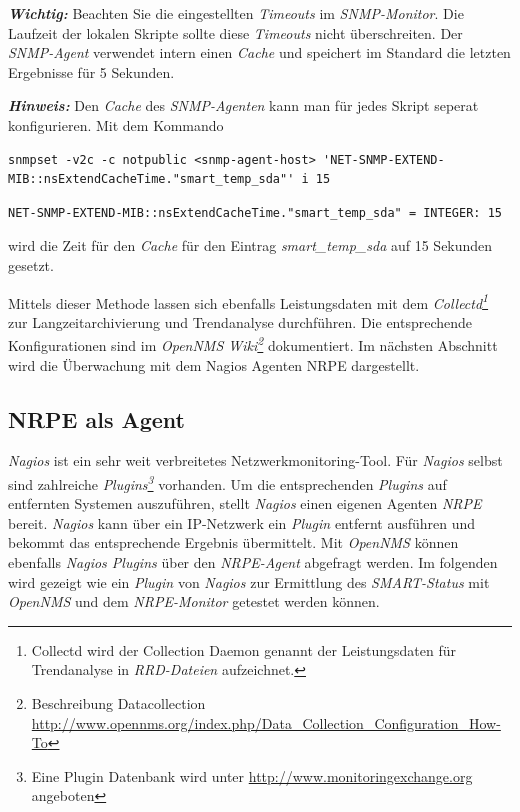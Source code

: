 \textbf{\textit{Wichtig:}} Beachten Sie die eingestellten \emph{Timeouts} im \emph{SNMP-Monitor}. Die Laufzeit der lokalen Skripte sollte diese \emph{Timeouts} nicht überschreiten. Der \emph{SNMP-Agent} verwendet intern einen \emph{Cache} und speichert im Standard die letzten Ergebnisse für 5 Sekunden. 

\textbf{\textit{Hinweis:}} Den \emph{Cache} des \emph{SNMP-Agenten} kann man für jedes Skript seperat konfigurieren. Mit dem Kommando

\begin{lstlisting}[numbers=none]
snmpset -v2c -c notpublic <snmp-agent-host> 'NET-SNMP-EXTEND-MIB::nsExtendCacheTime."smart_temp_sda"' i 15
\end{lstlisting}

\begin{lstlisting}[numbers=none]
NET-SNMP-EXTEND-MIB::nsExtendCacheTime."smart_temp_sda" = INTEGER: 15
\end{lstlisting}

wird die Zeit für den \emph{Cache} für den Eintrag \emph{smart\_temp\_sda} auf 15 Sekunden gesetzt. 

Mittels dieser Methode lassen sich ebenfalls Leistungsdaten mit dem \emph{Collectd\footnote{Collectd wird der Collection Daemon genannt der Leistungsdaten für Trendanalyse in \emph{RRD-Dateien} aufzeichnet.}} zur Langzeitarchivierung und Trendanalyse durchführen. Die entsprechende Konfigurationen sind im \emph{OpenNMS Wiki\footnote{Beschreibung Datacollection \url{http://www.opennms.org/index.php/Data\_Collection\_Configuration_How-To}}} dokumentiert. Im nächsten Abschnitt wird die Überwachung mit dem Nagios Agenten NRPE dargestellt.

\subsection{NRPE als Agent}
\emph{Nagios} ist ein sehr weit verbreitetes Netzwerkmonitoring-Tool. Für \emph{Nagios} selbst sind zahlreiche \emph{Plugins\footnote{Eine Plugin Datenbank wird unter \url{http://www.monitoringexchange.org} angeboten}} vorhanden. Um die entsprechenden \emph{Plugins} auf entfernten Systemen auszuführen, stellt \emph{Nagios} einen eigenen Agenten \emph{NRPE} bereit. \emph{Nagios} kann über ein IP-Netzwerk ein \emph{Plugin} entfernt ausführen und bekommt das entsprechende Ergebnis übermittelt. Mit \emph{OpenNMS} können ebenfalls \emph{Nagios Plugins} über den \emph{NRPE-Agent} abgefragt werden. Im folgenden wird gezeigt wie ein \emph{Plugin} von \emph{Nagios} zur Ermittlung des \emph{SMART-Status} mit \emph{OpenNMS} und dem \emph{NRPE-Monitor} getestet werden können.

